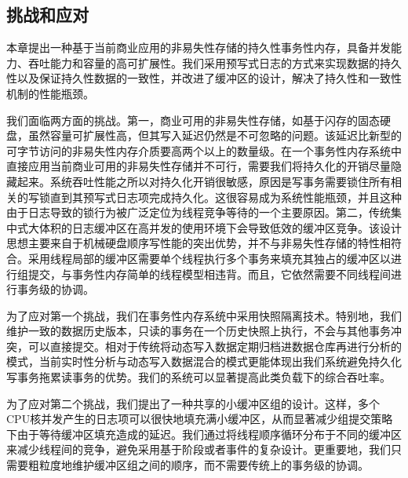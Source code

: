 \subsection{挑战和应对}

本章提出一种基于当前商业应用的非易失性存储的持久性事务性内存，具备并发能力、吞吐能力和容量的高可扩展性。我们采用预写式日志的方式来实现数据的持久性以及保证持久性数据的一致性，并改进了缓冲区的设计，解决了持久性和一致性机制的性能瓶颈。

我们面临两方面的挑战。第一，商业可用的非易失性存储，如基于闪存的固态硬盘，虽然容量可扩展性高，但其写入延迟仍然是不可忽略的问题。该延迟比新型的可字节访问的非易失性内存介质要高两个以上的数量级。在一个事务性内存系统中直接应用当前商业可用的非易失性存储并不可行，需要我们将持久化的开销尽量隐藏起来。系统吞吐性能之所以对持久化开销很敏感，原因是写事务需要锁住所有相关的写锁直到其预写式日志项完成持久化。这很容易成为系统性能瓶颈\cite{Chen:2009:FEF:1559845.1559855,
Johnson:2010:ASA:1920841.1920928, Johnson:2012:SWL:2205457.2205463,
Zheng:2014:FDF:2685048.2685085}，并且这种由于日志导致的锁行为\cite{Johnson:2010:ASA:1920841.1920928}被广泛定位为线程竞争等待的一个主要原因。第二，传统集中式大体积的日志缓冲区在高并发的使用环境下会导致低效的缓冲区竞争\cite{Johnson:2010:ASA:1920841.1920928,
Huang:2014:NLT:2735496.2735502}。该设计思想主要来自于机械硬盘顺序写性能的突出优势，并不与非易失性存储的特性相符合。采用线程局部的缓冲区\cite{Johnson:2012:SWL:2205457.2205463,
Zheng:2014:FDF:2685048.2685085, Wang:2014:SLT:2732951.2732960}需要单个线程执行多个事务来填充其独占的缓冲区以进行组提交，与事务性内存简单的线程模型相违背。而且，它依然需要不同线程间进行事务级的协调\cite{Johnson:2012:SWL:2205457.2205463,Wang:2014:SLT:2732951.2732960}。

为了应对第一个挑战，我们在事务性内存系统中采用快照隔离技术。特别地，我们维护一致的数据历史版本，只读的事务在一个历史快照上执行，不会与其他事务冲突，可以直接提交。相对于传统将动态写入数据定期归档进数据仓库再进行分析的模式，当前实时性分析与动态写入数据混合的模式\cite{ren2011querying,
Cheng:2012:KTP:2168836.2168846,4302625,Corbett:2012:SGG:2387880.2387905}更能体现出我们系统避免持久化写事务拖累读事务的优势。我们的系统可以显著提高此类负载下的综合吞吐率。

为了应对第二个挑战，我们提出了一种共享的小缓冲区组的设计。这样，多个CPU核并发产生的日志项可以很快地填充满小缓冲区，从而显著减少组提交策略下由于等待缓冲区填充造成的延迟。我们通过将线程顺序循环分布于不同的缓冲区来减少线程间的竞争，避免采用基于阶段或者事件的复杂设计。更重要地，我们只需要粗粒度地维护缓冲区组之间的顺序，而不需要传统上的事务级的协调。

